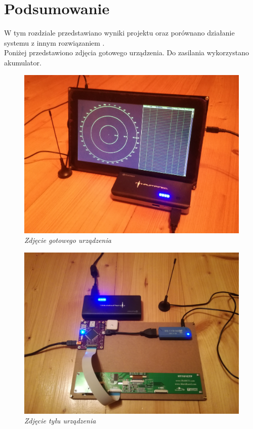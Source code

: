 \documentclass[eng,printmode]{mgr}
\begin{document}
\chapter{ Podsumowanie }
W tym rozdziale przedstawiano wyniki projektu oraz porównano działanie systemu z innym rozwiązaniem .
\\


Poniżej przedstawiono zdjęcia gotowego urządzenia. Do zasilania wykorzystano akumulator.

\vskip 1cm
\begin{figure}[!h]
    \centering
    \includegraphics[width=\textwidth]{images/deviceTop2}
    \caption{\textit{Zdjęcie gotowego urządzenia}}
\end{figure}
\newpage
\begin{figure}[!h]
    \centering
    \includegraphics[width=\textwidth]{images/deviceBottom}
    \caption{\textit{Zdjęcie tyłu urządzenia}}
\end{figure}
\end{document}
